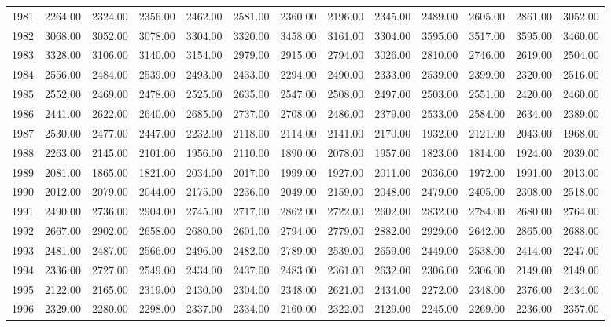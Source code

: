 \begin{longtable}{rrrrrrrrrrrrr}
  1981 & 2264.00 & 2324.00 & 2356.00 & 2462.00 & 2581.00 & 2360.00 & 2196.00 & 2345.00 & 2489.00 & 2605.00 & 2861.00 & 3052.00 \\ 
  1982 & 3068.00 & 3052.00 & 3078.00 & 3304.00 & 3320.00 & 3458.00 & 3161.00 & 3304.00 & 3595.00 & 3517.00 & 3595.00 & 3460.00 \\ 
  1983 & 3328.00 & 3106.00 & 3140.00 & 3154.00 & 2979.00 & 2915.00 & 2794.00 & 3026.00 & 2810.00 & 2746.00 & 2619.00 & 2504.00 \\ 
  1984 & 2556.00 & 2484.00 & 2539.00 & 2493.00 & 2433.00 & 2294.00 & 2490.00 & 2333.00 & 2539.00 & 2399.00 & 2320.00 & 2516.00 \\ 
  1985 & 2552.00 & 2469.00 & 2478.00 & 2525.00 & 2635.00 & 2547.00 & 2508.00 & 2497.00 & 2503.00 & 2551.00 & 2420.00 & 2460.00 \\ 
  1986 & 2441.00 & 2622.00 & 2640.00 & 2685.00 & 2737.00 & 2708.00 & 2486.00 & 2379.00 & 2533.00 & 2584.00 & 2634.00 & 2389.00 \\ 
  1987 & 2530.00 & 2477.00 & 2447.00 & 2232.00 & 2118.00 & 2114.00 & 2141.00 & 2170.00 & 1932.00 & 2121.00 & 2043.00 & 1968.00 \\ 
  1988 & 2263.00 & 2145.00 & 2101.00 & 1956.00 & 2110.00 & 1890.00 & 2078.00 & 1957.00 & 1823.00 & 1814.00 & 1924.00 & 2039.00 \\ 
  1989 & 2081.00 & 1865.00 & 1821.00 & 2034.00 & 2017.00 & 1999.00 & 1927.00 & 2011.00 & 2036.00 & 1972.00 & 1991.00 & 2013.00 \\ 
  1990 & 2012.00 & 2079.00 & 2044.00 & 2175.00 & 2236.00 & 2049.00 & 2159.00 & 2048.00 & 2479.00 & 2405.00 & 2308.00 & 2518.00 \\ 
  1991 & 2490.00 & 2736.00 & 2904.00 & 2745.00 & 2717.00 & 2862.00 & 2722.00 & 2602.00 & 2832.00 & 2784.00 & 2680.00 & 2764.00 \\ 
  1992 & 2667.00 & 2902.00 & 2658.00 & 2680.00 & 2601.00 & 2794.00 & 2779.00 & 2882.00 & 2929.00 & 2642.00 & 2865.00 & 2688.00 \\ 
  1993 & 2481.00 & 2487.00 & 2566.00 & 2496.00 & 2482.00 & 2789.00 & 2539.00 & 2659.00 & 2449.00 & 2538.00 & 2414.00 & 2247.00 \\ 
  1994 & 2336.00 & 2727.00 & 2549.00 & 2434.00 & 2437.00 & 2483.00 & 2361.00 & 2632.00 & 2306.00 & 2306.00 & 2149.00 & 2149.00 \\ 
  1995 & 2122.00 & 2165.00 & 2319.00 & 2430.00 & 2304.00 & 2348.00 & 2621.00 & 2434.00 & 2272.00 & 2348.00 & 2376.00 & 2434.00 \\ 
  1996 & 2329.00 & 2280.00 & 2298.00 & 2337.00 & 2334.00 & 2160.00 & 2322.00 & 2129.00 & 2245.00 & 2269.00 & 2236.00 & 2357.00 \\ 

\end{longtable}
